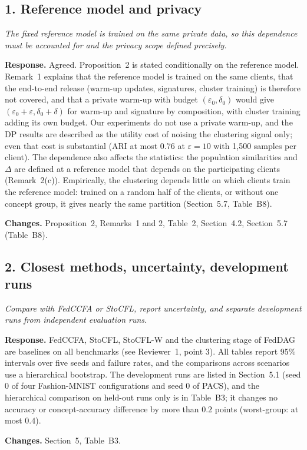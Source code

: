 \documentclass[11pt]{article}
\newenvironment{revcomment}{\par\medskip\noindent\begin{minipage}{\linewidth}\color{blue!45!black}\itshape}{\end{minipage}\par\smallskip}
\newcommand{\resp}{\par\noindent\textbf{Response.} }
\newcommand{\chg}{\par\noindent\textbf{Changes.} }
\begin{document}
\subsection*{1. Reference model and privacy}
\begin{revcomment}
The fixed reference model is trained on the same private data, so this dependence must be accounted for and the privacy scope defined precisely.
\end{revcomment}
\resp Agreed. Proposition~2 is stated conditionally on the reference model. Remark~1 explains that the reference model is trained on the same clients, that the end-to-end release (warm-up updates, signatures, cluster training) is therefore not covered, and that a private warm-up with budget $(\varepsilon_0,\delta_0)$ would give $(\varepsilon_0+\varepsilon,\delta_0+\delta)$ for warm-up and signature by composition, with cluster training adding its own budget. Our experiments do not use a private warm-up, and the DP results are described as the utility cost of noising the clustering signal only; even that cost is substantial (ARI at most $0.76$ at $\varepsilon=10$ with 1{,}500 samples per client). The dependence also affects the statistics: the population similarities and $\Delta$ are defined at a reference model that depends on the participating clients (Remark~2(c)). Empirically, the clustering depends little on which clients train the reference model: trained on a random half of the clients, or without one concept group, it gives nearly the same partition (Section~5.7, Table~B8).
\chg Proposition~2, Remarks~1 and 2, Table~2, Section~4.2, Section~5.7 (Table~B8).

\subsection*{2. Closest methods, uncertainty, development runs}
\begin{revcomment}
Compare with FedCCFA or StoCFL, report uncertainty, and separate development runs from independent evaluation runs.
\end{revcomment}
\resp FedCCFA, StoCFL, StoCFL-W and the clustering stage of FedDAG are baselines on all benchmarks (see Reviewer~1, point 3). All tables report 95\% intervals over five seeds and failure rates, and the comparisons across scenarios use a hierarchical bootstrap. The development runs are listed in Section~5.1 (seed 0 of four Fashion-MNIST configurations and seed 0 of PACS), and the hierarchical comparison on held-out runs only is in Table~B3; it changes no accuracy or concept-accuracy difference by more than $0.2$ points (worst-group: at most $0.4$).
\chg Section~5, Table~B3.
\end{document}
